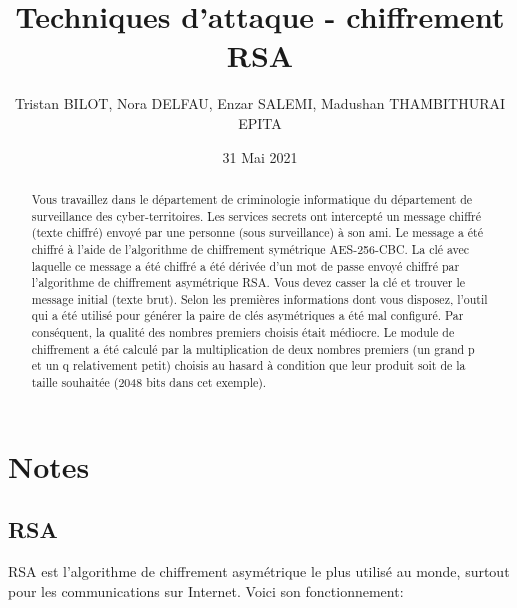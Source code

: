 \documentclass[12pt, oneside]{article}
\begin{document}
\title{Techniques d'attaque - chiffrement RSA}
\author{Tristan BILOT, Nora DELFAU, Enzar SALEMI, Madushan THAMBITHURAI\\EPITA}
\date{31 Mai 2021}
\maketitle

\begin{abstract}
Vous travaillez dans le département de criminologie informatique du département de surveillance des cyber-territoires. Les services secrets ont intercepté un message chiffré (texte chiffré) envoyé par une personne (sous surveillance) à son ami. Le message a été chiffré à l'aide de l'algorithme de chiffrement symétrique AES-256-CBC. La clé avec laquelle ce message a été chiffré a été dérivée d'un mot de passe envoyé chiffré par l'algorithme de chiffrement asymétrique RSA. Vous devez casser la clé et trouver le message initial (texte brut). Selon les premières informations dont vous disposez, l'outil qui a été utilisé pour générer la paire de clés asymétriques a été mal configuré. Par conséquent, la qualité des nombres premiers choisis était médiocre. Le module de chiffrement a été calculé par la multiplication de deux nombres premiers (un grand p et un q relativement petit) choisis au hasard à condition que leur produit soit de la taille souhaitée (2048 bits dans cet exemple).
\end{abstract}

\section{Notes}
\subsection{RSA}
RSA est l'algorithme de chiffrement asymétrique le plus utilisé au monde, surtout pour les communications sur Internet. Voici son fonctionnement:
\end{document}
